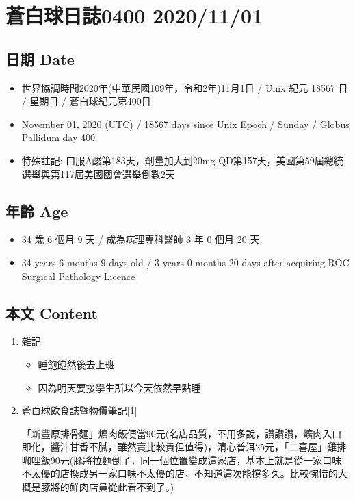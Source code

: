 \documentclass[
]{article}
\author{}
\date{}
\providecommand{\tightlist}{%
  \setlength{\itemsep}{0pt}\setlength{\parskip}{0pt}}
\begin{document}
\hypertarget{ux84bcux767dux7403ux65e5ux8a8c0400-20201101}{%
\section{蒼白球日誌0400
2020/11/01}\label{ux84bcux767dux7403ux65e5ux8a8c0400-20201101}}

\hypertarget{ux65e5ux671f-date}{%
\subsection{日期 Date}\label{ux65e5ux671f-date}}

\begin{itemize}
\tightlist
\item
  世界協調時間2020年(中華民國109年，令和2年)11月1日 / Unix 紀元 18567 日
  / 星期日 / 蒼白球紀元第400日
\item
  November 01, 2020 (UTC) / 18567 days since Unix Epoch / Sunday /
  Globus Pallidum day 400
\item
  特殊註記: 口服A酸第183天，劑量加大到20mg
  QD第157天，美國第59屆總統選舉與第117屆美國國會選舉倒數2天
\end{itemize}

\hypertarget{ux5e74ux9f61-age}{%
\subsection{年齡 Age}\label{ux5e74ux9f61-age}}

\begin{itemize}
\tightlist
\item
  34 歲 6 個月 9 天 / 成為病理專科醫師 3 年 0 個月 20 天
\item
  34 years 6 months 9 days old / 3 years 0 months 20 days after
  acquiring ROC Surgical Pathology Licence
\end{itemize}

\hypertarget{ux672cux6587-content}{%
\subsection{本文 Content}\label{ux672cux6587-content}}

\begin{enumerate}
\def\labelenumi{\arabic{enumi}.}
\item
  雜記

  \begin{itemize}
  \tightlist
  \item
    睡飽飽然後去上班
  \item
    因為明天要接學生所以今天依然早點睡
  \end{itemize}
\item
  蒼白球飲食誌暨物價筆記{[}1{]}

  「新豐原排骨麵」爌肉飯便當90元(名店品質，不用多說，讚讚讚，爌肉入口即化，醬汁甘香不膩，雖然賣比較貴但值得)，清心普洱25元，「二喜屋」雞排咖哩飯90元(豚將拉麵倒了，同一個位置變成這家店，基本上就是從一家口味不太優的店換成另一家口味不太優的店，不知道這次能撐多久。比較惋惜的大概是豚將的鮮肉店員從此看不到了。)
\end{enumerate}
\end{document}
